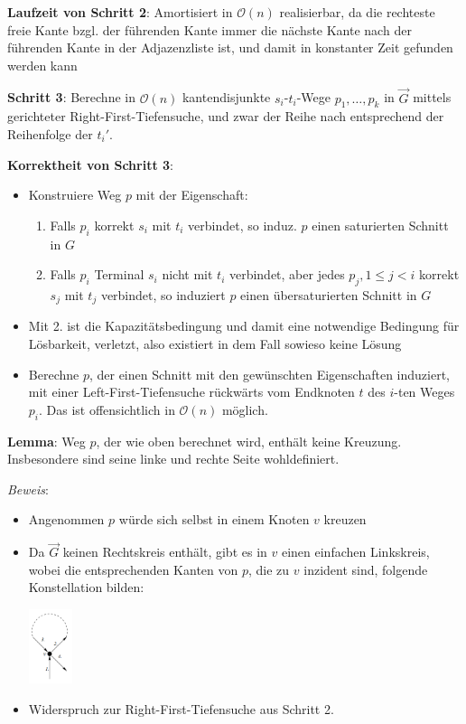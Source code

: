 \textbf{Laufzeit von Schritt 2}: Amortisiert in $\mathcal{O}(n)$ realisierbar, da die rechteste freie Kante bzgl. der führenden Kante immer die nächste Kante nach der führenden Kante in der Adjazenzliste ist, und damit in konstanter Zeit gefunden werden kann

\textbf{Schritt 3}: Berechne in $\mathcal{O}(n)$ kantendisjunkte $s_i$-$t_i$-Wege $p_1,\ldots,p_k$ in $\overrightarrow{G}$ mittels gerichteter Right-First-Tiefensuche, und zwar der Reihe nach entsprechend der Reihenfolge der $t_i'$.

\textbf{Korrektheit von Schritt 3}:
\begin{itemize}
	\item Konstruiere Weg $p$ mit der Eigenschaft:
	\begin{enumerate}
		\item Falls $p_i$ korrekt $s_i$ mit $t_i$ verbindet, so induz. $p$ einen saturierten Schnitt in $G$
		\item Falls $p_i$ Terminal $s_i$ nicht mit $t_i$ verbindet, aber jedes $p_j, 1\leq j<i$ korrekt $s_j$ mit $t_j$ verbindet, so induziert $p$ einen übersaturierten Schnitt in $G$
	\end{enumerate}
	\item Mit 2. ist die Kapazitätsbedingung und damit eine notwendige Bedingung für Lösbarkeit, verletzt, also existiert in dem Fall sowieso keine Lösung
	\item Berechne $p$, der einen Schnitt mit den gewünschten Eigenschaften induziert, mit einer Left-First-Tiefensuche rückwärts vom Endknoten $t$ des $i$-ten Weges $p_i$. Das ist offensichtlich in $\mathcal{O}(n)$ möglich.
\end{itemize}

\textbf{Lemma}: Weg $p$, der wie oben berechnet wird, enthält keine Kreuzung. Insbesondere sind seine linke und rechte Seite wohldefiniert.

\textit{Beweis}: 
\begin{itemize}
	\item Angenommen $p$ würde sich selbst in einem Knoten $v$ kreuzen
	\item Da $\overrightarrow{G}$ keinen Rechtskreis enthält, gibt es in $v$ einen einfachen Linkskreis, wobei die entsprechenden Kanten von $p$, die zu $v$ inzident sind, folgende Konstellation bilden:
	\begin{center}
		\includegraphics[width=0.1\textwidth]{images/s6.png}
	\end{center}
    \item Widerspruch zur Right-First-Tiefensuche aus Schritt 2.
\end{itemize}

